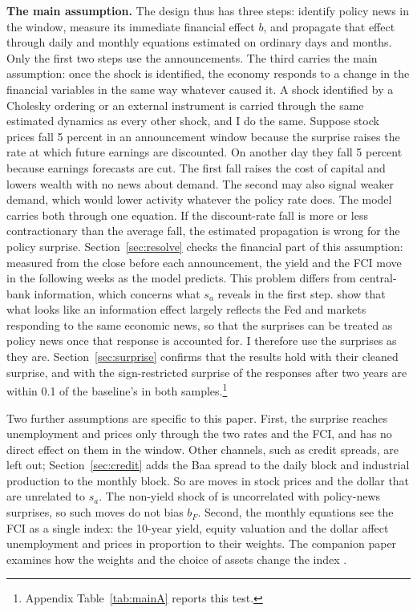 \documentclass[11pt]{article}
\begin{document}
\textbf{The main assumption.} The design thus has three steps: identify policy news in the window, measure its immediate financial effect $b$, and propagate that effect through daily and monthly equations estimated on ordinary days and months. Only the first two steps use the announcements. The third carries the main assumption: once the shock is identified, the economy responds to a change in the financial variables in the same way whatever caused it. A shock identified by a Cholesky ordering or an external instrument is carried through the same estimated dynamics as every other shock, and I do the same. Suppose stock prices fall 5 percent in an announcement window because the surprise raises the rate at which future earnings are discounted. On another day they fall 5 percent because earnings forecasts are cut. The first fall raises the cost of capital and lowers wealth with no news about demand. The second may also signal weaker demand, which would lower activity whatever the policy rate does. The model carries both through one equation. If the discount-rate fall is more or less contractionary than the average fall, the estimated propagation is wrong for the policy surprise. Section~\ref{sec:resolve} checks the financial part of this assumption: measured from the close before each announcement, the yield and the FCI move in the following weeks as the model predicts. This problem differs from central-bank information, which concerns what $s_a$ reveals in the first step. \citet{bauer2023aer} show that what looks like an information effect largely reflects the Fed and markets responding to the same economic news, so that the surprises can be treated as policy news once that response is accounted for. I therefore use the surprises as they are. Section~\ref{sec:surprise} confirms that the results hold with their cleaned surprise, and with the sign-restricted surprise of \citet{jarocinski2020} the responses after two years are within 0.1 of the baseline's in both samples.\footnote{Appendix Table~\ref{tab:mainA} reports this test.}

Two further assumptions are specific to this paper. First, the surprise reaches unemployment and prices only through the two rates and the FCI, and has no direct effect on them in the window. Other channels, such as credit spreads, are left out; Section~\ref{sec:credit} adds the Baa spread to the daily block and industrial production to the monthly block. So are moves in stock prices and the dollar that are unrelated to $s_a$. The non-yield shock of \citet{boehm2024} is uncorrelated with policy-news surprises, so such moves do not bias $b_F$. Second, the monthly equations see the FCI as a single index: the 10-year yield, equity valuation and the dollar affect unemployment and prices in proportion to their weights. The companion paper examines how the weights and the choice of assets change the index \citep{fcinote}.
\end{document}
